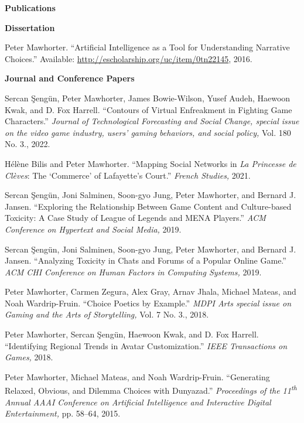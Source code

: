 \documentclass[11pt]{article}
\newenvironment{pubs}[1]{%
  \vspace{8pt}\textbf{\Large #1} \hrulefill\vspace{6pt}
  \begin{adjustwidth}{14pt}{0pt}
  \setlength{\parskip}{4pt}
  \setlength{\parindent}{-8pt}
}{%
  \end{adjustwidth}
}
\newcommand{\plainpub}[4]{%
\begin{samepage}
#1. ``#2.'' #3, #4.

\end{samepage}%
}
\newcommand{\fullpub}[5]{%
\begin{samepage}
#1. ``#2.'' \textit{#3,} #4, #5.

\end{samepage}%
}
\newcommand{\nppub}[4]{%
\begin{samepage}
#1. ``#2.'' \textit{#3,} #4.

\end{samepage}%
}
\newcommand{\heading}[1]{\textbf{\large #1}\vspace{4pt}}
\newcommand{\tsup}[1]{\textsuperscript{#1}}
\begin{document}
\begin{pubs}{Publications}

\vspace{6pt}
\hspace*{-0.8em}\heading{Dissertation}

\plainpub{Peter Mawhorter}{Artificial Intelligence as a Tool for Understanding Narrative Choices}{\hfill\break Available: \url{http://escholarship.org/uc/item/0tn22145}}{2016}

\vspace{6pt}
\heading{Journal and Conference Papers}

\fullpub{Sercan \c{S}eng\"un, Peter Mawhorter, James Bowie-Wilson, Yusef Audeh, Haewoon Kwak, and D. Fox Harrell}{Contours of Virtual Enfreakment in Fighting Game Characters}{Journal of Technological Forecasting and Social Change, special issue on the video game industry, users' gaming behaviors, and social policy}{Vol. 180 No. 3.}{2022}

\nppub{Hélène Bilis and Peter Mawhorter}{Mapping Social Networks in \emph{La Princesse de Clèves}: The `Commerce' of Lafayette's Court}{French Studies}{2021}

\nppub{Sercan \c{S}eng\"un, Joni Salminen, Soon-gyo Jung, Peter Mawhorter, and Bernard J. Jansen}{Exploring the Relationship Between Game Content and Culture-based Toxicity: A Case Study of League of Legends and MENA Players}{ACM Conference on Hypertext and Social Media}{2019}

\nppub{Sercan \c{S}eng\"un, Joni Salminen, Soon-gyo Jung, Peter Mawhorter, and Bernard J. Jansen}{Analyzing Toxicity in Chats and Forums of a Popular Online Game}{ACM CHI Conference on Human Factors in Computing Systems}{2019}

\fullpub{Peter Mawhorter, Carmen Zegura, Alex Gray, Arnav Jhala, Michael Mateas, and Noah Wardrip-Fruin}{Choice Poetics by Example}{MDPI Arts special issue on Gaming and the Arts of Storytelling}{Vol. 7 No. 3.}{2018}

\nppub{Peter Mawhorter, Sercan \c{S}eng\"un, Haewoon Kwak, and D. Fox Harrell}{Identifying Regional Trends in Avatar Customization}{IEEE Transactions on Games}{2018}

\fullpub{Peter Mawhorter, Michael Mateas, and Noah Wardrip-Fruin}{Generating Relaxed, Obvious, and Dilemma Choices with Dunyazad}{Proceedings of the 11\tsup{th} Annual AAAI Conference on Artificial Intelligence and Interactive Digital Entertainment}{pp. 58--64}{2015}


\end{pubs}
\end{document}
